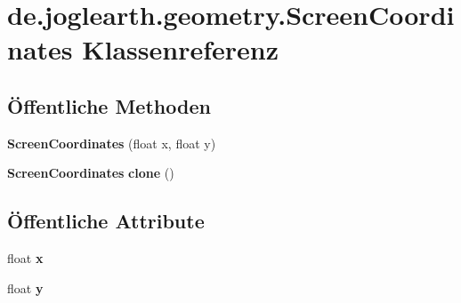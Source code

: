 \section{de.\-joglearth.\-geometry.\-Screen\-Coordinates \-Klassenreferenz}
\label{classde_1_1joglearth_1_1geometry_1_1_screen_coordinates}
\subsection*{Öffentliche \-Methoden}
\begin{DoxyCompactItemize}
\item 
{\bfseries \-Screen\-Coordinates} (float x, float y)\label{classde_1_1joglearth_1_1geometry_1_1_screen_coordinates_afc87532187738efd163d3e42981c3aaa}

\item 
{\bf \-Screen\-Coordinates} {\bfseries clone} ()\label{classde_1_1joglearth_1_1geometry_1_1_screen_coordinates_a331deb737a91c46e453ea2ea1639ca0e}

\end{DoxyCompactItemize}
\subsection*{Öffentliche \-Attribute}
\begin{DoxyCompactItemize}
\item 
float {\bfseries x}\label{classde_1_1joglearth_1_1geometry_1_1_screen_coordinates_ac92e209f6e5cdc4576c2f78084429aed}

\item 
float {\bfseries y}\label{classde_1_1joglearth_1_1geometry_1_1_screen_coordinates_a3916869098772aa49552deae6aa0e1cc}

\end{DoxyCompactItemize}
